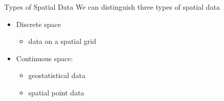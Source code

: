\documentclass[
  ignorenonframetext,
]{beamer}
\providecommand{\tightlist}{%
  \setlength{\itemsep}{0pt}\setlength{\parskip}{0pt}}
\begin{document}
\begin{frame}{Types of Spatial Data}
\protect\hypertarget{types-of-spatial-data}{}
We can distinguish three types of spatial data

\begin{itemize}
\item
  Discrete space

  \begin{itemize}
  \tightlist
  \item
    data on a spatial grid
  \end{itemize}
\item
  Continuous space:

  \begin{itemize}
  \item
    geostatistical data
  \item
    spatial point data
  \end{itemize}
\end{itemize}
\end{frame}
\end{document}
